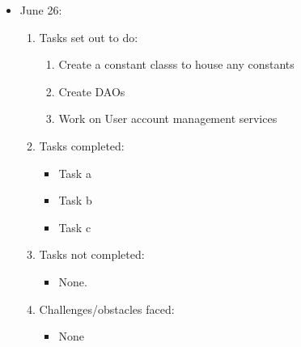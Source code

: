 	\begin{itemize}
		\item June 26:
		\begin{enumerate}
			\item Tasks set out to do:
			\begin{enumerate}
				\item Create a constant classs to house any constants
				\item Create DAOs
				\item Work on User account management services				
			\end{enumerate}
			\item Tasks completed:
			\begin{itemize}
				\item Task a
				\item Task b
				\item Task c
			\end{itemize}
			\item Tasks not completed:
			\begin{itemize}
				\item None.
			\end{itemize}
			\item Challenges/obstacles faced:
			\begin{itemize}
				\item None
			\end{itemize}			
		\end{enumerate}
	\end{itemize}
	
